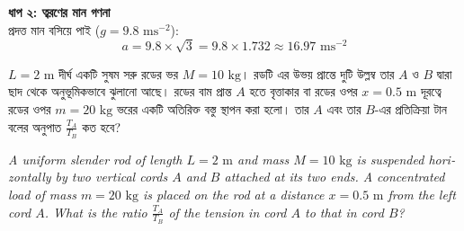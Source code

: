 \documentclass[12pt, a4paper]{article}
\begin{document}
{{\begin{tcolorbox}[solutionbox={সমাধান (Solution)}]
    \vspace{0.5em}
    \noindent\textbf{ধাপ ২: ত্বরণের মান গণনা} \\
    প্রদত্ত মান বসিয়ে পাই ($g = 9.8\text{ ms}^{-2}$):
    \[ a = 9.8 \times \sqrt{3} = 9.8 \times 1.732 \approx \mathbf{16.97}\text{ ms}^{-2} \]
\end{tcolorbox}

\newpage

\begin{tcolorbox}[questionbox={প্রশ্ন (Question) 45}]
    \noindent
    $L = 2\text{ m}$ দীর্ঘ একটি সুষম সরু রডের ভর $M = 10\text{ kg}$। রডটি এর উভয় প্রান্তে দুটি উল্লম্ব তার $A$ ও $B$ দ্বারা ছাদ থেকে অনুভূমিকভাবে ঝুলানো আছে। রডের বাম প্রান্ত $A$ হতে বৃত্তাকার বা রডের ওপর $x = 0.5\text{ m}$ দূরত্বে রডের ওপর $m = 20\text{ kg}$ ভরের একটি অতিরিক্ত বস্তু স্থাপন করা হলো। তার $A$ এবং তার $B$-এর প্রতিক্রিয়া টান বলের অনুপাত $\frac{T_A}{T_B}$ কত হবে?
    
    \vspace{0.8em}
    \begin{english}
    \noindent\textit{\color{darkgray}
    A uniform slender rod of length $L = 2\text{ m}$ and mass $M = 10\text{ kg}$ is suspended horizontally by two vertical cords $A$ and $B$ attached at its two ends. A concentrated load of mass $m = 20\text{ kg}$ is placed on the rod at a distance $x = 0.5\text{ m}$ from the left cord $A$. What is the ratio $\frac{T_A}{T_B}$ of the tension in cord $A$ to that in cord $B$?
    }
    \end{english}
\end{tcolorbox}

\vspace{1em}
\begin{center}
\end{center}}}
\end{document}
